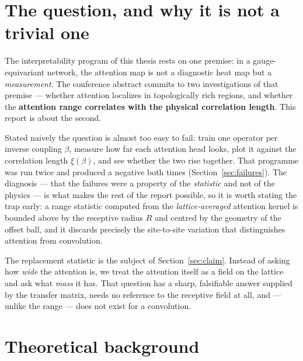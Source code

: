 \documentclass[11pt,a4paper]{article}
\begin{document}
\tableofcontents

\section{The question, and why it is not a trivial one}
\label{sec:intro}

The interpretability program of this thesis rests on one premise: in a
gauge-equivariant network, the attention map is not a diagnostic heat map but a
\emph{measurement}. The conference abstract commits to two investigations of
that premise --- whether attention localizes in topologically rich regions, and
whether the \textbf{attention range correlates with the physical correlation
length}. This report is about the second.

Stated naively the question is almost too easy to fail: train one operator per
inverse coupling $\beta$, measure how far each attention head looks, plot it
against the correlation length $\xi(\beta)$, and see whether the two rise
together. That programme was run twice and produced a negative both times
(Section~\ref{sec:failures}). The diagnosis --- that the failures were a property
of the \emph{statistic} and not of the physics --- is what makes the rest of the
report possible, so it is worth stating the trap early: a range statistic
computed from the \emph{lattice-averaged} attention kernel is bounded above by
the receptive radius $R$ and centred by the geometry of the offset ball, and it
discards precisely the site-to-site variation that distinguishes attention from
convolution.

The replacement statistic is the subject of Section~\ref{sec:claim}. Instead of
asking how \emph{wide} the attention is, we treat the attention itself as a
field on the lattice and ask what \emph{mass} it has. That question has a sharp,
falsifiable answer supplied by the transfer matrix, needs no reference to the
receptive field at all, and --- unlike the range --- does not exist for a
convolution.

\section{Theoretical background}
\label{sec:theory}
\end{document}
